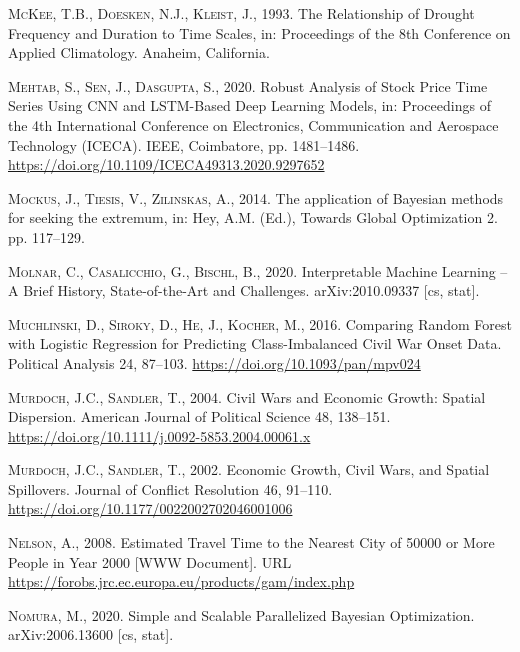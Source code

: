 \documentclass[a4paper,11pt]{article}
\begin{document}
\leavevmode\hypertarget{ref-mckee1993}{}%
\textsc{McKee, T.B., Doesken, N.J., Kleist, J.}, 1993. The Relationship of Drought Frequency and Duration to Time Scales, in: Proceedings of the 8th Conference on Applied Climatology. Anaheim, California.

\leavevmode\hypertarget{ref-mehtab2020a}{}%
\textsc{Mehtab, S., Sen, J., Dasgupta, S.}, 2020. Robust Analysis of Stock Price Time Series Using CNN and LSTM-Based Deep Learning Models, in: Proceedings of the 4th International Conference on Electronics, Communication and Aerospace Technology (ICECA). IEEE, Coimbatore, pp. 1481--1486. \url{https://doi.org/10.1109/ICECA49313.2020.9297652}

\leavevmode\hypertarget{ref-mockus2014}{}%
\textsc{Mockus, J., Tiesis, V., Zilinskas, A.}, 2014. The application of Bayesian methods for seeking the extremum, in: Hey, A.M. (Ed.), Towards Global Optimization 2. pp. 117--129.

\leavevmode\hypertarget{ref-molnar2020}{}%
\textsc{Molnar, C., Casalicchio, G., Bischl, B.}, 2020. Interpretable Machine Learning -- A Brief History, State-of-the-Art and Challenges. arXiv:2010.09337 {[}cs, stat{]}.

\leavevmode\hypertarget{ref-muchlinski2016}{}%
\textsc{Muchlinski, D., Siroky, D., He, J., Kocher, M.}, 2016. Comparing Random Forest with Logistic Regression for Predicting Class-Imbalanced Civil War Onset Data. Political Analysis 24, 87--103. \url{https://doi.org/10.1093/pan/mpv024}

\leavevmode\hypertarget{ref-murdoch2004}{}%
\textsc{Murdoch, J.C., Sandler, T.}, 2004. Civil Wars and Economic Growth: Spatial Dispersion. American Journal of Political Science 48, 138--151. \url{https://doi.org/10.1111/j.0092-5853.2004.00061.x}

\leavevmode\hypertarget{ref-murdoch2002}{}%
\textsc{Murdoch, J.C., Sandler, T.}, 2002. Economic Growth, Civil Wars, and Spatial Spillovers. Journal of Conflict Resolution 46, 91--110. \url{https://doi.org/10.1177/0022002702046001006}

\leavevmode\hypertarget{ref-nelson2008}{}%
\textsc{Nelson, A.}, 2008. Estimated Travel Time to the Nearest City of 50000 or More People in Year 2000 {[}WWW Document{]}. URL \url{https://forobs.jrc.ec.europa.eu/products/gam/index.php}

\leavevmode\hypertarget{ref-nomura2020}{}%
\textsc{Nomura, M.}, 2020. Simple and Scalable Parallelized Bayesian Optimization. arXiv:2006.13600 {[}cs, stat{]}.
\end{document}
